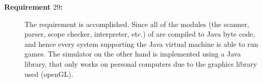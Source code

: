 \begin{description}
  \item[\textbf{Requirement $29$:}]
    The requirement is accomplished. Since all of the modules (the
    scanner, parser, scope checker, interpreter, etc.) of \productname{}
    are compiled to Java byte code, and hence every system supporting
    the Java virtual machine is able to run \productname{} games. The
    simulator on the other hand is implemented using a Java library,
    that only works on personal computers due to the graphics library
    used (openGL).
\end{description} 

